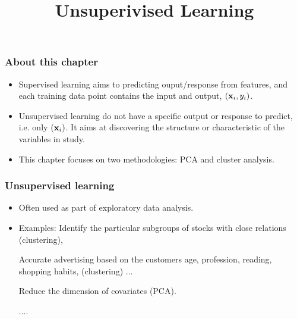 \documentclass{beamer}
\title[Chapter 10]{Unsuperivised Learning}
\author{ }
\institute[ ]
{
	Chapter 10 \\ 
	\medskip
	\textit{ } 
}
\def\bfx{{\bf x}}
\begin{document}
	 	
	 	\begin{frame}
	 		\titlepage %
	 	\end{frame}
	
 \begin{frame}
 	\frametitle{ }
 	\tableofcontents
 \end{frame}
  
 
      
      
      \begin{frame}
      	\frametitle{About this chapter}
      	\begin{itemize}
      		\item  Supervised learning aims to predicting ouput/response from features, and 
      		each training data point contains the input and output, $(\bfx_i,y_i)$. 
      		\item  Unsupervised learning do not have a specific output or response to predict, i.e. only $(\bfx_i)$. It aims at 
      		discovering the structure or characteristic of the variables in study.
      		\item  This chapter focuses on two methodologies: PCA and cluster analysis.
      		
      	 
        	\end{itemize}
        \end{frame}
        
         \begin{frame}
         	\frametitle{Unsupervised learning}
         	\begin{itemize}
         		\item Often used as part of exploratory data analysis.
         		\item Examples: 
         		     Identify the particular subgroups of stocks with close relations (clustering), 
         		     
         		     Accurate advertising based on the customers age, profession, reading, shopping habits, (clustering) ...
         		     
         		     Reduce the dimension of covariates (PCA). 
         		     
         		     ....
         		     
         		 
         		
         	\end{itemize}
         \end{frame}
        
\end{document}
